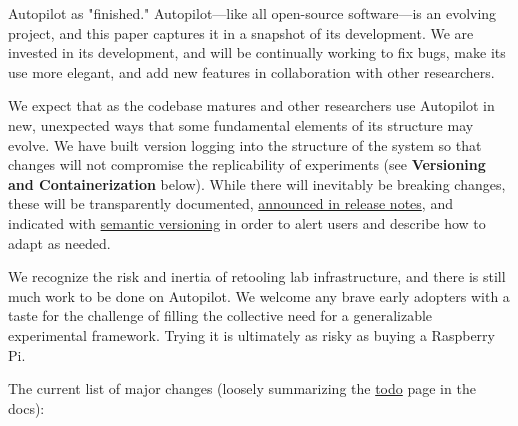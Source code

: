 


 Autopilot as "finished." Autopilot---like all open-source software---is an evolving project, and this paper captures it in a snapshot of its development. We are invested in its development, and will be continually working to fix bugs, make its use more elegant, and add new features in collaboration with other researchers. 

We expect that as the codebase matures and other researchers use Autopilot in new, unexpected ways that some fundamental elements of its structure may evolve. We have built version logging into the structure of the system so that changes will not compromise the replicability of experiments (see \textbf{Versioning and Containerization} below). While there will inevitably be breaking changes, these will be transparently documented, \href{https://docs.auto-pi-lot.com/en/latest/changelog/index.html}{announced in release notes}, and indicated with \href{https://semver.org/}{semantic versioning} in order to alert users and describe how to adapt as needed. 

We recognize the risk and inertia of retooling lab infrastructure, and there is still much work to be done on Autopilot. We welcome any brave early adopters with a taste for the challenge of filling the collective need for a generalizable experimental framework. Trying it is ultimately as risky as buying a Raspberry Pi. 

\vspace{12pt}

\noindent The current list of major changes (loosely summarizing the \href{https://docs.auto-pi-lot.com/en/latest/todo.html}{todo} page in the docs):


